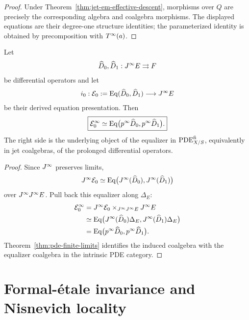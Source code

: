 \begin{proof}
Under Theorem~\ref{thm:jet-em-effective-descent}, morphisms over $Q$ are precisely the corresponding algebra and coalgebra morphisms.  The displayed equations are their degree-one structure identities; the parameterized identity is obtained by precomposition with $T^{\infty}(a)$.
\end{proof}

\begin{corollary}
\label{cor:prolonged-equalizer}
Let
\[
    \widehat D_0,\widehat D_1:J^{\infty} E\rightrightarrows F
\]
be differential operators and let
\[
    i_0:\mathcal E_0:=\operatorname{Eq}(\widehat D_0,\widehat D_1)
    \longrightarrow J^{\infty} E
\]
be their derived equation presentation.  Then
\[
\boxed{
    \mathcal E_0^\infty
    \simeq
    \operatorname{Eq}\bigl(p^\infty\widehat D_0,p^\infty\widehat D_1\bigr).
}
\]
The right side is the underlying object of the equalizer in $\operatorname{PDE}^{\mathrm{fi}}_{X/S}$, equivalently in jet coalgebras, of the prolonged differential operators.
\end{corollary}

\begin{proof}
Since $J^{\infty}$ preserves limits,
\[
    J^{\infty}\mathcal E_0
    \simeq
    \operatorname{Eq}\bigl(J^{\infty}(\widehat D_0),J^{\infty}(\widehat D_1)\bigr)
\]
over $J^{\infty}J^{\infty} E$.  Pull back this equalizer along $\Delta_E$:
\[
\begin{aligned}
\mathcal E_0^\infty
&=
J^{\infty}\mathcal E_0\times_{J^{\infty}J^{\infty} E}J^{\infty} E\\
&\simeq
\operatorname{Eq}\bigl(
J^{\infty}(\widehat D_0)\Delta_E,
J^{\infty}(\widehat D_1)\Delta_E
\bigr)\\
&=
\operatorname{Eq}\bigl(p^\infty\widehat D_0,p^\infty\widehat D_1\bigr).
\end{aligned}
\]
Theorem~\ref{thm:pde-finite-limits} identifies the induced coalgebra with the equalizer coalgebra in the intrinsic PDE category.
\end{proof}

\section{Formal-\'{e}tale invariance and Nisnevich locality}
\label{sec:jet-formal-etale}


